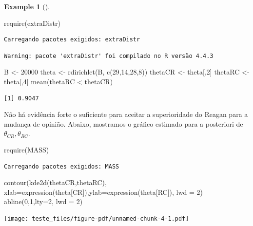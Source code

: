 \documentclass[
  letterpaper,
  DIV=11,
  numbers=noendperiod]{scrreprt}
\newenvironment{Shaded}{\begin{snugshade}}{\end{snugshade}}
\newcommand{\AttributeTok}[1]{\textcolor[rgb]{0.40,0.45,0.13}{#1}}
\newcommand{\DecValTok}[1]{\textcolor[rgb]{0.68,0.00,0.00}{#1}}
\newcommand{\FunctionTok}[1]{\textcolor[rgb]{0.28,0.35,0.67}{#1}}
\newcommand{\NormalTok}[1]{\textcolor[rgb]{0.00,0.23,0.31}{#1}}
\newcommand{\OtherTok}[1]{\textcolor[rgb]{0.00,0.23,0.31}{#1}}
\newcommand{\SpecialCharTok}[1]{\textcolor[rgb]{0.37,0.37,0.37}{#1}}
\theoremstyle{definition}
\theoremstyle{definition}
\newtheorem{example}{Example}[chapter]
\theoremstyle{plain}
\theoremstyle{remark}
\begin{document}
\begin{example}[]
\begin{Shaded}
\begin{Highlighting}[]
\FunctionTok{require}\NormalTok{(extraDistr)}
\end{Highlighting}
\end{Shaded}

\begin{verbatim}
Carregando pacotes exigidos: extraDistr
\end{verbatim}

\begin{verbatim}
Warning: pacote 'extraDistr' foi compilado no R versão 4.4.3
\end{verbatim}

\begin{Shaded}
\begin{Highlighting}[]
\NormalTok{B }\OtherTok{\textless{}{-}} \DecValTok{20000}
\NormalTok{theta }\OtherTok{\textless{}{-}} \FunctionTok{rdirichlet}\NormalTok{(B, }\FunctionTok{c}\NormalTok{(}\DecValTok{29}\NormalTok{,}\DecValTok{14}\NormalTok{,}\DecValTok{28}\NormalTok{,}\DecValTok{8}\NormalTok{))}
\NormalTok{thetaCR }\OtherTok{\textless{}{-}}\NormalTok{ theta[,}\DecValTok{2}\NormalTok{]}
\NormalTok{thetaRC }\OtherTok{\textless{}{-}}\NormalTok{ theta[,}\DecValTok{4}\NormalTok{]}
\FunctionTok{mean}\NormalTok{(thetaRC }\SpecialCharTok{\textless{}}\NormalTok{ thetaCR)}
\end{Highlighting}
\end{Shaded}

\begin{verbatim}
[1] 0.9047
\end{verbatim}

Não há evidência forte o suficiente para aceitar a superioridade do
Reagan para a mudança de opinião. Abaixo, mostramos o gráfico estimado
para a posteriori de \(\theta_{CR},\theta_{RC}\).

\begin{Shaded}
\begin{Highlighting}[]
\FunctionTok{require}\NormalTok{(MASS)}
\end{Highlighting}
\end{Shaded}

\begin{verbatim}
Carregando pacotes exigidos: MASS
\end{verbatim}

\begin{Shaded}
\begin{Highlighting}[]
\FunctionTok{contour}\NormalTok{(}\FunctionTok{kde2d}\NormalTok{(thetaCR,thetaRC), }\AttributeTok{xlab=}\FunctionTok{expression}\NormalTok{(theta[CR]),}\AttributeTok{ylab=}\FunctionTok{expression}\NormalTok{(theta[RC]), }\AttributeTok{lwd =} \DecValTok{2}\NormalTok{)}
\FunctionTok{abline}\NormalTok{(}\DecValTok{0}\NormalTok{,}\DecValTok{1}\NormalTok{,}\AttributeTok{lty=}\DecValTok{2}\NormalTok{, }\AttributeTok{lwd =} \DecValTok{2}\NormalTok{)}
\end{Highlighting}
\end{Shaded}

\texttt{[image: teste\_files/figure-pdf/unnamed-chunk-4-1.pdf]}

\end{example}
\end{document}
